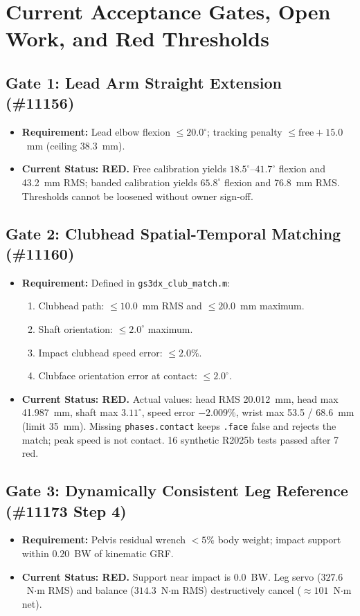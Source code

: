 \documentclass[11pt,a4paper]{article}
\begin{document}
\section{Current Acceptance Gates, Open Work, and Red Thresholds}

\subsection{Gate 1: Lead Arm Straight Extension (\#11156)}
\begin{itemize}
    \item \textbf{Requirement:} Lead elbow flexion $\le 20.0^\circ$; tracking penalty $\le \text{free} + 15.0$~mm (ceiling $38.3$~mm).
    \item \textbf{Current Status: RED.} Free calibration yields $18.5^\circ$--$41.7^\circ$ flexion and 43.2~mm RMS; banded calibration yields $65.8^\circ$ flexion and 76.8~mm RMS. Thresholds cannot be loosened without owner sign-off.
\end{itemize}

\subsection{Gate 2: Clubhead Spatial-Temporal Matching (\#11160)}
\begin{itemize}
    \item \textbf{Requirement:} Defined in \texttt{gs3dx\_club\_match.m}:
    \begin{enumerate}
        \item Clubhead path: $\le 10.0$~mm RMS and $\le 20.0$~mm maximum.
        \item Shaft orientation: $\le 2.0^\circ$ maximum.
        \item Impact clubhead speed error: $\le 2.0\%$.
        \item Clubface orientation error at contact: $\le 2.0^\circ$.
    \end{enumerate}
    \item \textbf{Current Status: RED.} Actual values: head RMS 20.012~mm, head max 41.987~mm, shaft max $3.11^\circ$, speed error $-2.009\%$, wrist max 53.5 / 68.6~mm (limit 35~mm). Missing \texttt{phases.contact} keeps \texttt{.face} false and rejects the match; peak speed is not contact. 16 synthetic R2025b tests passed after 7 red.
\end{itemize}

\subsection{Gate 3: Dynamically Consistent Leg Reference (\#11173 Step 4)}
\begin{itemize}
    \item \textbf{Requirement:} Pelvis residual wrench $< 5\%$ body weight; impact support within $0.20$~BW of kinematic GRF.
    \item \textbf{Current Status: RED.} Support near impact is 0.0~BW. Leg servo ($327.6$~N$\cdot$m RMS) and balance ($314.3$~N$\cdot$m RMS) destructively cancel ($\approx 101$~N$\cdot$m net).
\end{itemize}
\end{document}

